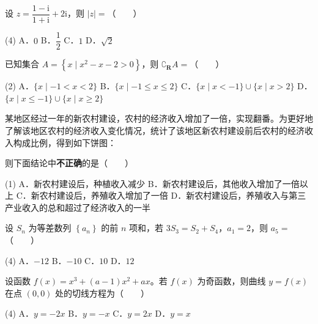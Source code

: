 \begin{question}
设 $z=\dfrac{1-\mathrm i}{1+\mathrm i}+2\mathrm i$，则 $|z|=$\mbox{（　　）}

\begin{gkopts}(4)
\task A．$0$
\task B．$\dfrac12$
\task C．$1$
\task D．$\sqrt2$
\end{gkopts}

\end{question}
\begin{question}
已知集合 $A=\left\{x\mid x^{2}-x-2>0\right\}$，则 $\complement_{\mathbf R}A=$\mbox{（　　）}

\begin{gkopts}(2)
\task A．$\{x\mid-1<x<2\}$
\task B．$\{x\mid-1\le x\le2\}$
\task C．$\{x\mid x<-1\}\cup\{x\mid x>2\}$
\task D．$\{x\mid x\le-1\}\cup\{x\mid x\ge2\}$
\end{gkopts}

\Needspace{0.4\textheight}
\end{question}
\begin{question}
某地区经过一年的新农村建设，农村的经济收入增加了一倍，实现翻番。为更好地了解该地区农村的经济收入变化情况，统计了该地区新农村建设前后农村的经济收入构成比例，得到如下饼图：
\nopagebreak[4]
\begin{center}\end{center}
\nopagebreak[4]
则下面结论中\textbf{不正确}的是\mbox{（　　）}

\begin{gkopts}(1)
\task A．新农村建设后，种植收入减少
\task B．新农村建设后，其他收入增加了一倍以上
\task C．新农村建设后，养殖收入增加了一倍
\task D．新农村建设后，养殖收入与第三产业收入的总和超过了经济收入的一半
\end{gkopts}

\end{question}
\begin{question}
设 $S_n$ 为等差数列 $\left\{a_n\right\}$ 的前 $n$ 项和，若 $3S_3=S_2+S_4$，$a_1=2$，则 $a_5=$\mbox{（　　）}

\begin{gkopts}(4)
\task A．$-12$
\task B．$-10$
\task C．$10$
\task D．$12$
\end{gkopts}

\end{question}
\begin{question}
设函数 $f(x)=x^{3}+(a-1)x^{2}+ax$。若 $f(x)$ 为奇函数，则曲线 $y=f(x)$ 在点 $(0,0)$ 处的切线方程为\mbox{（　　）}

\begin{gkopts}(4)
\task A．$y=-2x$
\task B．$y=-x$
\task C．$y=2x$
\task D．$y=x$
\end{gkopts}

\end{question}
